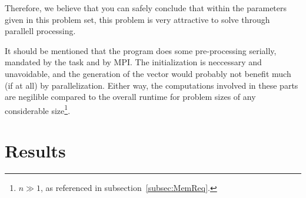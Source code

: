 \documentclass[fontsize=11pt,paper=a4,titlepage]{report}
\begin{document}
Therefore, we believe that you can safely conclude that within the parameters
given in this problem set, this problem is very attractive to solve through
parallell processing.


It should be mentioned that the program does some pre-processing serially,
mandated by the task and by MPI. The initialization is neccessary and
unavoidable, and the generation of the vector would probably not benefit much
(if at all) by parallelization. Either way, the computations involved in these
parts are negilible compared to the overall runtime for problem sizes of any
considerable size\footnote{$n \gg 1$, as referenced in
subsection~\ref{subsec:MemReq}.}.

\section{Results}

\end{document}
